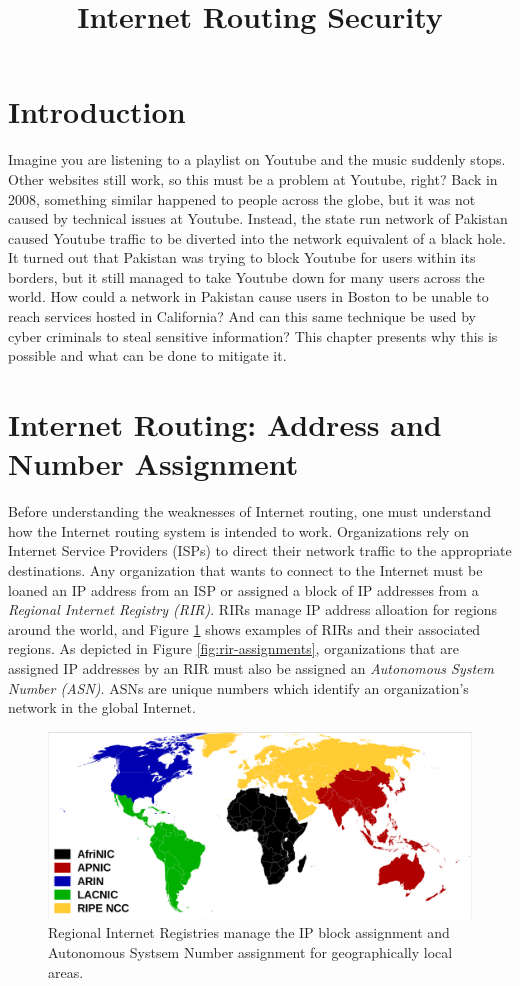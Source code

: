 \documentclass[conference]{IEEEtran}
\begin{document}
\title{Internet Routing Security}

\maketitle

\section{Introduction}
Imagine you are listening to a playlist on Youtube and the music suddenly stops.  Other websites still work, so this must be a problem at Youtube, right?  Back in 2008, something similar happened to people across the globe, but it was not caused by technical issues at Youtube.  Instead, the state run network of Pakistan caused Youtube traffic to be diverted into the network equivalent of a black hole.  It turned out that Pakistan was trying to block Youtube for users within its borders, but it still managed to take Youtube down for many users across the world.  How could a network in Pakistan cause users in Boston to be unable to reach services hosted in California?  And can this same technique be used by cyber criminals to steal sensitive information?  This chapter presents why this is possible and what can be done to mitigate it.

\section{Internet Routing: Address and Number Assignment}
Before understanding the weaknesses of Internet routing, one must understand how the Internet routing system is intended to work.  Organizations rely on Internet Service Providers (ISPs) to direct their network traffic to the appropriate destinations.  Any organization that wants to connect to the Internet must be loaned an IP address from an ISP or assigned a block of IP addresses from a \emph{Regional Internet Registry (RIR)}.  RIRs manage IP address alloation for regions around the world, and Figure \ref{fig:rirs} shows examples of RIRs and their associated regions.  As depicted in Figure \ref{fig:rir-assignments}, organizations that are assigned IP addresses by an RIR must also be assigned an \emph{Autonomous System Number (ASN)}.  ASNs are unique numbers which identify an organization's network in the global Internet.

\begin{figure}
  \includegraphics[width=\linewidth]{images/rirs.png}
  \caption{Regional Internet Registries manage the IP block assignment and Autonomous Systsem Number assignment for geographically local areas.}
  \label{fig:rirs}
\end{figure}
\end{document}

